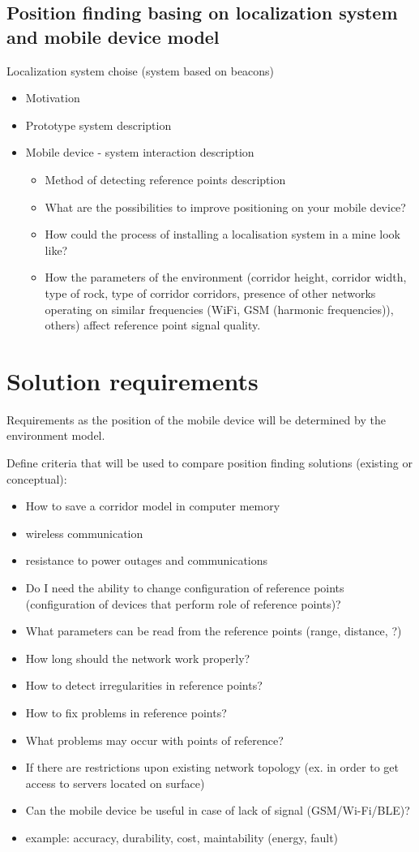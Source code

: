 \documentclass[../main.tex]{subfiles}
\begin{document}
\subsection{Position finding basing on localization system and mobile device model}

Localization system choise (system based on beacons)
\begin{itemize}
	\item  Motivation
	\item  Prototype system description
	\item  Mobile device - system interaction description
	\begin{itemize}
		\item  Method of detecting reference points description
		\item  What are the possibilities to improve positioning on your mobile device?
		\item  How could the process of installing a localisation system in a mine look like?
		\item  How the parameters of the environment (corridor height, corridor width, type of rock, type of corridor corridors, presence of other networks operating on similar frequencies (WiFi, GSM (harmonic frequencies)), others) affect reference point signal quality.
	\end{itemize}
\end{itemize}


\section{Solution requirements}
Requirements as the position of the mobile device will be determined by the environment model.

Define criteria that will be used to compare position finding solutions (existing or conceptual):
\begin{itemize}
	\item How to save a corridor model in computer memory
	\item wireless communication
	\item resistance to power outages and communications
	\item Do I need the ability to change configuration of reference points (configuration of devices that perform role of reference points)?
	\item What parameters can be read from the reference points (range, distance, ?)
	\item How long should the network work properly?
	\item How to detect irregularities in reference points?
	\item How to fix problems in reference points?
	\item What problems may occur with points of reference?
	\item If there are restrictions upon existing network topology (ex. in order to get access to servers located on surface)
	\item Can the mobile device be useful in case of lack of signal (GSM/Wi-Fi/BLE)?
	\item example: accuracy, durability, cost, maintability (energy, fault)
\end{itemize}
\end{document}
